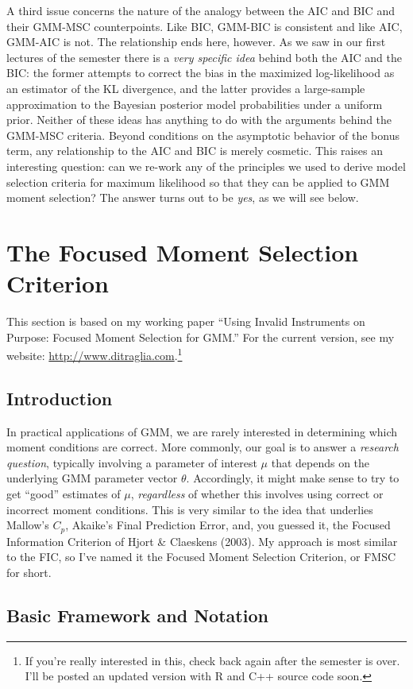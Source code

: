 \documentclass[12pt]{article}
\theoremstyle{definition}
\begin{document}
A third issue concerns the nature of the analogy between the AIC and BIC and their GMM-MSC counterpoints. Like BIC, GMM-BIC is consistent and like AIC, GMM-AIC is not. The relationship ends here, however. As we saw in our first lectures of the semester there is a \emph{very specific idea} behind both the AIC and the BIC: the former attempts to correct the bias in the maximized log-likelihood as an estimator of the KL divergence, and the latter provides a large-sample approximation to the Bayesian posterior model probabilities under a uniform prior. Neither of these ideas has anything to do with the arguments behind the GMM-MSC criteria. Beyond conditions on the asymptotic behavior of the bonus term, any relationship to the AIC and BIC is merely cosmetic. This raises an interesting question: can we re-work any of the principles we used to derive model selection criteria for maximum likelihood so that they can be applied to GMM moment selection? The answer turns out to be \emph{yes}, as we will see below.



\section{The Focused Moment Selection Criterion}
This section is based on my working paper ``Using Invalid Instruments on Purpose: Focused Moment Selection for GMM.'' For the current version, see my website: \url{http://www.ditraglia.com}.\footnote{If you're really interested in this, check back again after the semester is over. I'll be posted an updated version with R and C++ source code soon.}

\subsection{Introduction}
In practical applications of GMM, we are rarely interested in determining which moment conditions are correct. More commonly, our goal is to answer a \emph{research question}, typically involving a parameter of interest $\mu$ that depends on the underlying GMM parameter vector $\theta$. Accordingly, it might make sense to try to get ``good'' estimates of $\mu$, \emph{regardless} of whether this involves using correct or incorrect moment conditions. This is very similar to the idea that underlies Mallow's $C_p$, Akaike's Final Prediction Error, and, you guessed it, the Focused Information Criterion of Hjort \& Claeskens (2003). My approach is most similar to the FIC, so I've named it the Focused Moment Selection Criterion, or FMSC for short. 

\subsection{Basic Framework and Notation}
\end{document}
